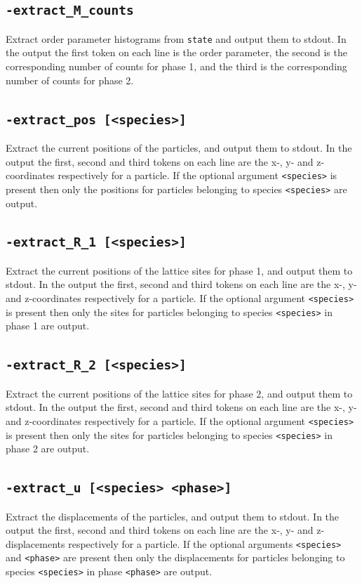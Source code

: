 \documentclass{report}
\begin{document}
\subsection{\texttt{-extract\_M\_counts}}
Extract order parameter histograms from \texttt{state} and output them to stdout. In the output the first token on each line is the order 
parameter, the second is the corresponding number of counts for phase 1, and the third is the corresponding number of counts for 
phase 2. 

\subsection{\texttt{-extract\_pos [<species>]}}
Extract the current positions of the particles, and output them to stdout. In the output the first, second and third tokens on each line 
are the x-, y- and z-coordinates respectively for a particle. If the optional argument \texttt{<species>} is present then only the positions
for particles belonging to species \texttt{<species>} are output.

\subsection{\texttt{-extract\_R\_1 [<species>]}}
Extract the current positions of the lattice sites for phase 1, and output them to stdout. In the output the first, second and third 
tokens on each line are the x-, y- and z-coordinates respectively for a particle. If the optional argument \texttt{<species>} is present 
then only the sites for particles belonging to species \texttt{<species>} in phase 1 are output.

\subsection{\texttt{-extract\_R\_2 [<species>]}}
Extract the current positions of the lattice sites for phase 2, and output them to stdout. In the output the first, second and third 
tokens on each line are the x-, y- and z-coordinates respectively for a particle. If the optional argument \texttt{<species>} is present 
then only the sites for particles belonging to species \texttt{<species>} in phase 2 are output.

\subsection{\texttt{-extract\_u [<species> <phase>]}}
Extract the displacements of the particles, and output them to stdout. In the output the first, second and third tokens on each line are 
the x-, y- and z-displacements respectively for a particle. If the optional arguments \texttt{<species>} and \texttt{<phase>} are present 
then only the displacements for particles belonging to species \texttt{<species>} in phase \texttt{<phase>} are output.
\end{document}
